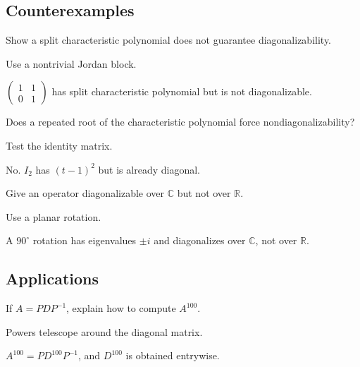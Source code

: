 \subsection*{Counterexamples}

\begin{exercise}\label{exr:i11-expand-10}
Show a split characteristic polynomial does not guarantee diagonalizability.
\end{exercise}
\begin{hint}
Use a nontrivial Jordan block.
\end{hint}
\begin{solution}
\(\begin{pmatrix}1&1\\0&1\end{pmatrix}\) has split characteristic polynomial but is not diagonalizable.
\end{solution}

\begin{exercise}\label{exr:i11-expand-11}
Does a repeated root of the characteristic polynomial force nondiagonalizability?
\end{exercise}
\begin{hint}
Test the identity matrix.
\end{hint}
\begin{solution}
No. \(I_2\) has \((t-1)^2\) but is already diagonal.
\end{solution}

\begin{exercise}\label{exr:i11-expand-12}
Give an operator diagonalizable over \(\mathbb C\) but not over \(\mathbb R\).
\end{exercise}
\begin{hint}
Use a planar rotation.
\end{hint}
\begin{solution}
A \(90^\circ\) rotation has eigenvalues \(\pm i\) and diagonalizes over \(\mathbb C\), not over \(\mathbb R\).
\end{solution}

\subsection*{Applications}

\begin{exercise}\label{exr:i11-expand-13}
If \(A=PDP^{-1}\), explain how to compute \(A^{100}\).
\end{exercise}
\begin{hint}
Powers telescope around the diagonal matrix.
\end{hint}
\begin{solution}
\(A^{100}=PD^{100}P^{-1}\), and \(D^{100}\) is obtained entrywise.
\end{solution}


